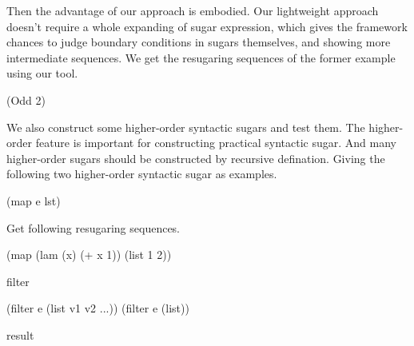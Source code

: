 Then the advantage of our approach is embodied. Our lightweight approach doesn't require a whole expanding of sugar expression, which gives the framework chances to judge boundary conditions in sugars themselves, and showing more intermediate sequences. We get the resugaring sequences of the former example using our tool.
\begin{Codes}
    (Odd 2)
\end{Codes}


We also construct some higher-order syntactic sugars and test them. The higher-order feature is important for constructing practical syntactic sugar. And many higher-order sugars should be constructed by recursive defination. Giving the following two higher-order syntactic sugar as examples.
\begin{Codes}
    (map e lst)
\end{Codes}
Get following resugaring sequences.
\begin{Codes}
    (map (lam (x) (+ x 1)) (list 1 2))
\end{Codes}
filter
\begin{Codes}
   (filter e (list v1 v2 ...))
   (filter e (list)) 
\end{Codes}
result

